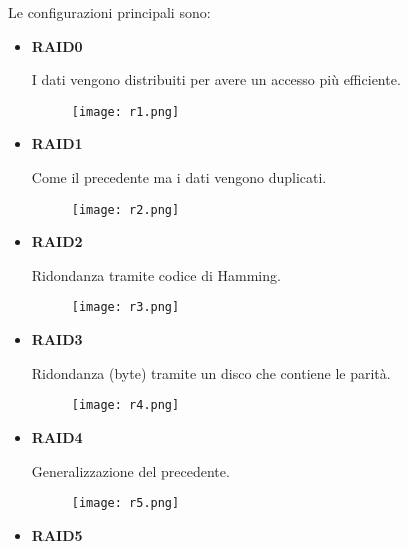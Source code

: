 \documentclass{article}
\begin{document}
\noindent Le configurazioni principali sono:
\begin{itemize}
    \item \textbf{RAID0}

        I dati vengono distribuiti per avere un accesso più efficiente.

        \begin{figure}[ht]
            \centering
            \texttt{[image: r1.png]}
            \label{fig:raid0}
        \end{figure}

    \item \textbf{RAID1}

        Come il precedente ma i dati vengono duplicati.

        \begin{figure}[ht]
            \centering
            \texttt{[image: r2.png]}
            \label{fig:raid1}
        \end{figure}

    \item \textbf{RAID2}

        Ridondanza tramite codice di Hamming.

        \begin{figure}[ht]
            \centering
            \texttt{[image: r3.png]}
            \label{fig:raid2}
        \end{figure}

    \item \textbf{RAID3}

        Ridondanza (byte) tramite un disco che contiene le parità.

        \begin{figure}[H]
            \centering
            \texttt{[image: r4.png]}
            \label{fig:raid3}
        \end{figure}

    \newpage

    \item \textbf{RAID4}

        Generalizzazione del precedente.

        \begin{figure}[ht]
            \centering
            \texttt{[image: r5.png]}
            \label{fig:raid4}
        \end{figure}

    \item \textbf{RAID5}


\end{itemize}
\end{document}
